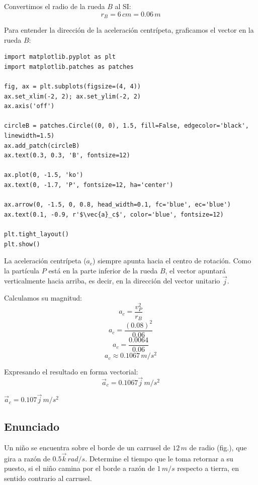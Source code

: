\documentclass[12pt, a4paper]{article}
\begin{document}
Convertimos el radio de la rueda $B$ al SI:
$$ r_B = 6 \, \si{cm} = 0.06 \, \si{m} $$

Para entender la dirección de la aceleración centrípeta, graficamos el vector en la rueda $B$:

\begin{lstlisting}
import matplotlib.pyplot as plt
import matplotlib.patches as patches

fig, ax = plt.subplots(figsize=(4, 4))
ax.set_xlim(-2, 2); ax.set_ylim(-2, 2)
ax.axis('off')

circleB = patches.Circle((0, 0), 1.5, fill=False, edgecolor='black', linewidth=1.5)
ax.add_patch(circleB)
ax.text(0.3, 0.3, 'B', fontsize=12)

ax.plot(0, -1.5, 'ko')
ax.text(0, -1.7, 'P', fontsize=12, ha='center')

ax.arrow(0, -1.5, 0, 0.8, head_width=0.1, fc='blue', ec='blue')
ax.text(0.1, -0.9, r'$\vec{a}_c$', color='blue', fontsize=12)

plt.tight_layout()
plt.show()
\end{lstlisting}

La aceleración centrípeta ($a_c$) siempre apunta hacia el centro de rotación. Como la partícula $P$ está en la parte inferior de la rueda $B$, el vector apuntará verticalmente hacia arriba, es decir, en la dirección del vector unitario $\vec{j}$.

Calculamos su magnitud:
$$ a_c = \frac{v_P^2}{r_B} $$
$$ a_c = \frac{(0.08)^2}{0.06} $$
$$ a_c = \frac{0.0064}{0.06} $$
$$ a_c \approx 0.1067 \, \si{m/s^2} $$

Expresando el resultado en forma vectorial:
$$ \vec{a}_c = 0.1067\vec{j} \, \si{m/s^2} $$

\begin{tcolorbox}[colback=green!5!white, colframe=green!50!black, title=Respuesta Final]
\centering \Large $\vec{a}_c = 0.107\vec{j} \, \si{m/s^2}$
\end{tcolorbox}

\newpage

\subsection*{Enunciado}
Un niño se encuentra sobre el borde de un carrusel de $12 \, \si{m}$ de radio (fig.), que gira a razón de $0.5\vec{k} \, \si{rad/s}$. Determine el tiempo que le toma retornar a su puesto, si el niño camina por el borde a razón de $1 \, \si{m/s}$ respecto a tierra, en sentido contrario al carrusel. 
\end{document}
